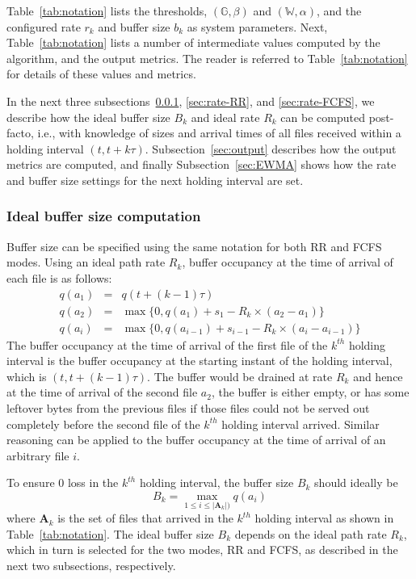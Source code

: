 Table~\ref{tab:notation} lists the thresholds, $(\mathbb{G},\beta)$ and $(\mathbb{W},\alpha)$, and the configured rate $r_k$ and buffer size $b_k$ as system parameters. Next, Table~\ref{tab:notation} lists a number of intermediate values
computed by the algorithm, and the output metrics.
The reader is referred
to Table~\ref{tab:notation} for details of these values
and metrics.

In the next three subsections~\ref{sec:buffer}, \ref{sec:rate-RR}, and \ref{sec:rate-FCFS},
we describe how the ideal buffer size  $B_k$ and ideal rate $R_k$
can be computed post-facto, i.e., with knowledge of sizes and
arrival times of all files received within a holding interval
$(t,t+k\tau)$. Subsection~\ref{sec:output} describes how
the output metrics are computed, and finally Subsection~\ref{sec:EWMA} shows how the rate and buffer
size settings for the next holding interval are set.

\subsubsection{Ideal buffer size computation}
\label{sec:buffer}

Buffer size can be specified using the same notation for both RR and FCFS modes. Using an ideal path rate $R_k$, buffer occupancy at the time of arrival of each
file is as follows:
\begin{eqnarray}
q(a_1) & = & q(t+(k-1)\tau) \nonumber \\
q(a_2) & = & \max\{0, q(a_1)+s_1 - R_k \times (a_2 -a_1)\} \nonumber \\
q(a_i) & = & \max\{0, q(a_{i-1}) +s_{i-1} - R_k \times (a_i -a_{i-1})\}
\end{eqnarray}
The buffer occupancy at the time of arrival of the first file
of the $k^{th}$ holding interval is the buffer occupancy at the starting instant of
the holding interval, which is $(t,t+(k-1) \tau)$.
The buffer would be drained at rate $R_k$ and hence at the time of arrival
of the second file $a_2$, the buffer is either empty, or has some leftover
bytes from the previous files if those files could not be served out completely before the second file of the $k^{th}$ holding interval arrived. Similar reasoning can be
applied to the buffer occupancy at the time of arrival of an arbitrary
file $i$.

To ensure 0 loss in the $k^{th}$ holding interval, the buffer size $B_k$ should ideally be
\begin{equation}\label{eqn:ideal-buffer}
B_k = \max_{1 \leq i \leq \left\vert\textbf{A}_k\right\vert)} q(a_i)
\end{equation}
where $\textbf{A}_k$ is the set of files that arrived in the
$k^{th}$ holding interval as shown in Table~\ref{tab:notation}. The ideal buffer size $B_k$ depends
on the ideal path rate $R_k$, which in turn is selected for the two modes,
RR and FCFS, as described in the next two subsections, respectively.

